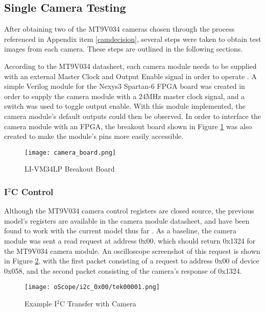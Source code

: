 \subsection{Single Camera Testing}
After obtaining two of the MT9V034 cameras chosen through the process referenced in Appendix item \ref{camdecision}, several steps were taken to obtain test images from each camera. These steps are outlined in the following sections.
\par
According to the MT9V034 datasheet, each camera module needs to be supplied with an external Master Clock and Output Enable signal in order to operate \cite{mt9v034}. A simple Verilog module for the Nexys3 Spartan-6 FPGA board was created in order to supply the camera module with a 24MHz master clock signal, and a switch was used to toggle output enable. With this module implemented, the camera module's default outputs could then be observed. In order to interface the camera module with an FPGA, the breakout board shown in Figure \ref{camBreakoutBoard} was also created to make the module's pins more easily accessible. 

\begin{figure}[H]
	\centerline{\texttt{[image: camera\_board.png]}}
	\caption{LI-VM34LP Breakout Board}
	\label{camBreakoutBoard}
\end{figure}

\subsubsection{I$^2$C Control} 
Although the MT9V034 camera control registers are closed source, the previous model's registers are available in the camera module datasheet, and have been found to work with the current model thus far \cite{mt9v032}. As a baseline, the camera module was sent a read request at address 0x00, which should return 0x1324 for the MT9V034 camera module. An oscilloscope screenshot of this request is shown in Figure \ref{camVersion}, with the first packet consisting of a request to address 0x00 of device 0x058, and the second packet consisting of the camera's response of 0x1324. 
\begin{figure}[H]
	\centerline{\texttt{[image: oScope/i2c\_0x00/tek00001.png]}}
	\caption{Example I$^2$C Transfer with Camera}
	\label{camVersion}
\end{figure}

